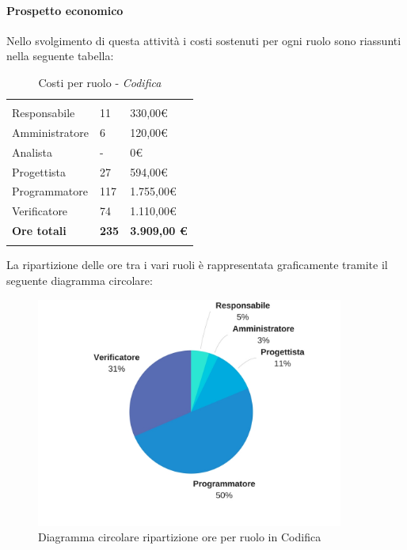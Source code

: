 			\paragraph{Prospetto economico} \Spazio
			Nello svolgimento di questa attività i costi sostenuti per ogni ruolo sono riassunti nella seguente tabella:
			\begin{table}[H]
				\centering
				\begin{tabular}{p{4cm}|C{4cm}|C{4cm}}
					
					 & &\\
					Responsabile & 11 & 330,00\euro \\
					\hline
					Amministratore& 6 & 120,00\euro \\
					\hline
					Analista & - & 0\euro \\
					\hline
					Progettista & 27 & 594,00\euro \\
					\hline
					Programmatore & 117 & 1.755,00\euro \\
					\hline
					Verificatore & 74 & 1.110,00\euro \\
					\hline
					\textbf{Ore totali} & \textbf{235} & \textbf{3.909,00 \euro} \\
				\end{tabular}
					\caption{Costi per ruolo - \textit{Codifica}}
			\end{table}
			
			La ripartizione delle ore tra i vari ruoli è rappresentata graficamente tramite il seguente diagramma circolare:

		\begin{figure}[h!] 
			\centering 
			\includegraphics[width=0.9\textwidth]{images/CircolareCodifica.jpg} 
			\caption{Diagramma circolare ripartizione ore per ruolo in Codifica}
			\label{CircolareCodifica}
		\end{figure}
	
